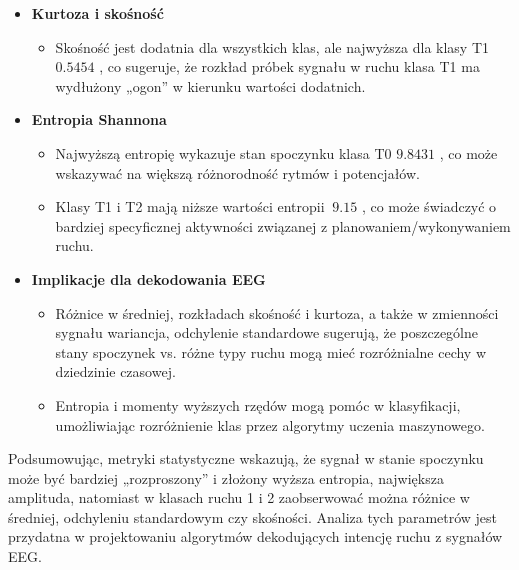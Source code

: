 \documentclass[eeg_v4.tex]{subfiles}
\begin{document}
\begin{itemize}
        \item \textbf{Kurtoza i skośność}
        \begin{itemize}
            \itemWszystkie klasy mają kurtozę poniżej 3, co oznacza, że rozkłady są raczej „spłaszczone” w porównaniu do
            rozkładu normalnego.
            \item Skośność jest dodatnia dla wszystkich klas, ale najwyższa dla klasy T1 \(0.5454\)
            , co sugeruje, że rozkład próbek sygnału w ruchu klasa T1 ma wydłużony „ogon” w kierunku wartości
            dodatnich.
        \end{itemize}

        \item \textbf{Entropia Shannona}
        \begin{itemize}
            \item Najwyższą entropię wykazuje stan spoczynku klasa T0 \(9.8431\)
            , co może wskazywać na większą różnorodność rytmów i potencjałów.
            \item Klasy T1 i T2 mają niższe wartości entropii \(~9.15\)
            , co może świadczyć o bardziej specyficznej aktywności związanej z planowaniem/wykonywaniem ruchu.
        \end{itemize}

        \item \textbf{Implikacje dla dekodowania EEG}
        \begin{itemize}
            \item
            Różnice w średniej, rozkładach skośność i kurtoza, a także w zmienności sygnału wariancja, odchylenie
            standardowe sugerują, że poszczególne stany spoczynek vs. różne typy ruchu mogą mieć rozróżnialne cechy w
            dziedzinie czasowej.
            \item
            Entropia i momenty wyższych rzędów mogą pomóc w klasyfikacji, umożliwiając rozróżnienie klas przez algorytmy
            uczenia maszynowego.
        \end{itemize}
    \end{itemize}

    Podsumowując, metryki statystyczne wskazują, że sygnał w stanie spoczynku może być bardziej „rozproszony” i złożony
    wyższa entropia, największa amplituda, natomiast w klasach ruchu 1 i 2 zaobserwować można różnice w średniej,
    odchyleniu standardowym czy skośności. Analiza tych parametrów jest przydatna w projektowaniu algorytmów
    dekodujących intencję ruchu z sygnałów EEG.
\end{document}
